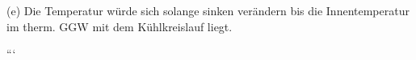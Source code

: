 (e) 
Die Temperatur würde sich solange sinken verändern bis die Innentemperatur im therm. GGW mit dem Kühlkreislauf liegt.

```